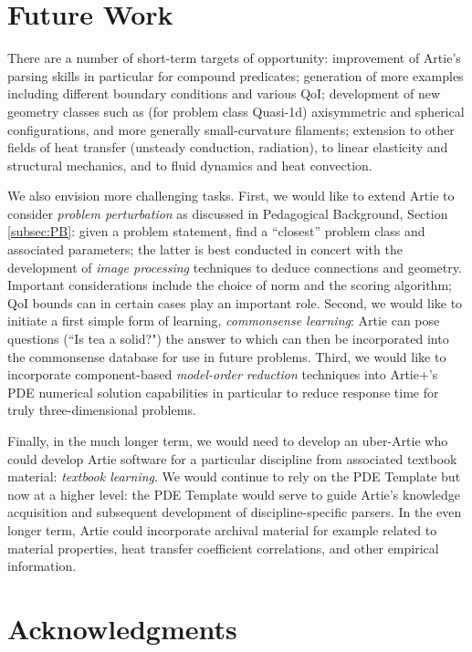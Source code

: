\documentclass[preprint,12pt]{article}
\begin{document}
\section{Future Work}

There are a number of short-term targets of opportunity: improvement of Artie's parsing skills in particular for compound predicates; generation of more examples including different boundary conditions and various QoI; development of new geometry classes such as (for problem class Quasi-1d) axisymmetric and spherical configurations, and more generally small-curvature filaments; extension to other fields of heat transfer (unsteady conduction, radiation), to linear elasticity and structural mechanics, and to fluid dynamics and heat convection.

We also envision more challenging tasks. First, we would like to extend Artie to consider {\em problem perturbation} as discussed in Pedagogical Background, Section \ref{subsec:PB}: given a problem statement, find a ``closest'' problem class and associated parameters; the latter is best conducted in concert with the development of {\em image processing} techniques to deduce connections and geometry. Important considerations include the choice of norm and the scoring algorithm; QoI bounds can in certain cases play an important role. Second, we would like to initiate a first simple form of learning, {\em commonsense learning}: Artie can pose questions (``Is tea a solid?") the answer to which can then be incorporated into the commonsense database for use in future problems. Third, we would like to incorporate component-based {\em model-order reduction} techniques \cite{Enu} into Artie+'s PDE numerical solution capabilities in particular to reduce response time for truly three-dimensional problems.

Finally, in the much longer term, we would need to develop an uber-Artie who could develop Artie software for a particular discipline from associated textbook material: {\em textbook learning}. We would continue to rely on the PDE Template but now at a higher level: the PDE Template would serve to guide Artie's knowledge acquisition and subsequent development of discipline-specific parsers. In the even longer term, Artie could incorporate archival material for example related to material properties, heat transfer coefficient correlations, and other empirical information.

\section{Acknowledgments}
\end{document}
